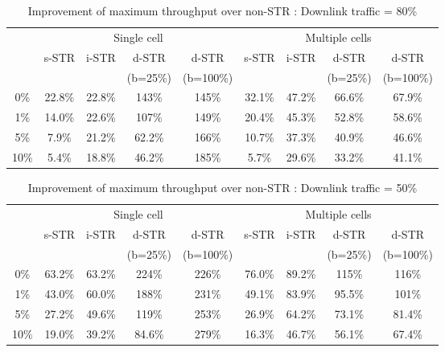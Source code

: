 \documentclass[twocolumn]{IEEEtran}
\begin{document}
\begin{center}
\begin{table*}[ht]
\centering \caption{Improvement of maximum throughput over non-STR :
Downlink traffic = 80\%}
\begin{small}
\begin{tabular}{c||c|c|c|c||c|c|c|c}
\hline
  \hline
\multirow{3}{*}{}&\multicolumn{4}{c||}{Single cell}  &\multicolumn{4}{c}{Multiple cells}  \\
    \cline{2-9}
   & s-STR & i-STR & d-STR & d-STR & s-STR & i-STR & d-STR & d-STR  \\
  &   &    &(b=25\%)&(b=100\%)&  &  &(b=25\%)&(b=100\%)\\
  \hline
  \hline
  0\% & 22.8\% & 22.8\% & 143\%  & 145\% & 32.1\% & 47.2\% & 66.6\% & 67.9\% \\
  1\% & 14.0\% & 22.6\% & 107\%  & 149\% & 20.4\% & 45.3\% & 52.8\% & 58.6\%   \\
  5\% &  7.9\% & 21.2\% & 62.2\% & 166\% & 10.7\% & 37.3\% & 40.9\% & 46.6\%  \\
  10\% & 5.4\% & 18.8\% & 46.2\% & 185\% &  5.7\% & 29.6\% & 33.2\% & 41.1\% \\
\hline \hline
\end{tabular}
\end{small}
\end{table*}
\end{center}


\begin{center}
\begin{table*}[ht]
\centering \caption{Improvement of maximum throughput over non-STR :
Downlink traffic = 50\%}
\begin{small}
\begin{tabular}{c||c|c|c|c||c|c|c|c}
\hline
  \hline
\multirow{3}{*}{} &\multicolumn{4}{c||}{Single cell}  &\multicolumn{4}{c}{Multiple cells}  \\
    \cline{2-9}
   & s-STR & i-STR & d-STR & d-STR & s-STR & i-STR & d-STR & d-STR  \\
  &   &    &(b=25\%)&(b=100\%)&  &  &(b=25\%)&(b=100\%)\\
  \hline
  \hline
  0\% & 63.2\% & 63.2\% &  224\% &   226\% & 76.0\% & 89.2\% & 115\%  & 116\%\\
  1\% & 43.0\% & 60.0\% &  188\% &   231\% & 49.1\% & 83.9\% & 95.5\% & 101\%\\
  5\% & 27.2\% & 49.6\% &  119\% &   253\% & 26.9\% & 64.2\% & 73.1\% & 81.4\%\\
  10\%& 19.0\% & 39.2\% &  84.6\%&   279\% & 16.3\% & 46.7\% & 56.1\% & 67.4\%\\
\hline \hline
\end{tabular}
\end{small}
\end{table*}
\end{center}
\end{document}

